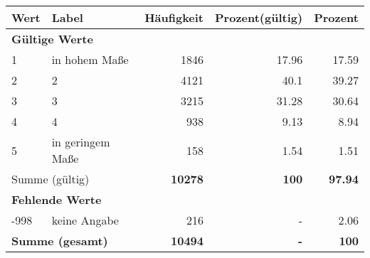      \begin{longtable}{lXrrr}
     \toprule
     \textbf{Wert} & \textbf{Label} & \textbf{Häufigkeit} & \textbf{Prozent(gültig)} & \textbf{Prozent} \\
     \endhead
     \midrule
     \multicolumn{5}{l}{\textbf{Gültige Werte}}\\

     1 &
     \multicolumn{1}{X}{ in hohem Maße   } &


       \num{1846} &
       \num[round-mode=places,round-precision=2]{17.96} &
         \num[round-mode=places,round-precision=2]{17.59} \\

     2 &
     \multicolumn{1}{X}{ 2   } &


       \num{4121} &
       \num[round-mode=places,round-precision=2]{40.1} &
         \num[round-mode=places,round-precision=2]{39.27} \\

     3 &
     \multicolumn{1}{X}{ 3   } &


       \num{3215} &
       \num[round-mode=places,round-precision=2]{31.28} &
         \num[round-mode=places,round-precision=2]{30.64} \\

     4 &
     \multicolumn{1}{X}{ 4   } &


       \num{938} &
       \num[round-mode=places,round-precision=2]{9.13} &
         \num[round-mode=places,round-precision=2]{8.94} \\

     5 &
     \multicolumn{1}{X}{ in geringem Maße   } &


       \num{158} &
       \num[round-mode=places,round-precision=2]{1.54} &
         \num[round-mode=places,round-precision=2]{1.51} \\
     \midrule
     \multicolumn{2}{l}{Summe (gültig)} &
       \textbf{\num{10278}} &
     \textbf{\num{100}} &
       \textbf{\num[round-mode=places,round-precision=2]{97.94}} \\
     \multicolumn{5}{l}{\textbf{Fehlende Werte}}\\
       -998 &
       keine Angabe &
         \num{216} &
        - &
         \num[round-mode=places,round-precision=2]{2.06} \\
     \midrule
     \multicolumn{2}{l}{\textbf{Summe (gesamt)}} &
          \textbf{\num{10494}} &
        \textbf{-} &
        \textbf{\num{100}} \\
     \bottomrule
     \end{longtable}
     
